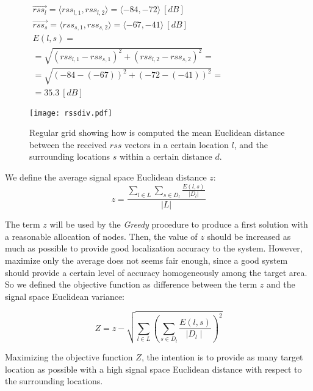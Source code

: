 \begin{figure}
\centering
\begin{minipage}{0.63\textwidth}

$
\begin{gathered}
\vec{rss_l} = \langle rss_{l,1}, rss_{l,2} \rangle = \langle-84, -72\rangle ~ [dB] \\
\vec{rss_s} = \langle rss_{s,1}, rss_{s,2} \rangle = \langle-67, -41\rangle ~ [dB] \\[5pt]
E(l,s) = \\ = \sqrt{(rss_{l,1} - rss_{s,1})^2 + (rss_{l,2} - rss_{s,2})^2} = \\
= \sqrt{(-84-(-67))^2 + (-72-(-41))^2} = \\ = 35.3 ~ [dB]
\end{gathered}
$

\end{minipage}%
\begin{minipage}{0.37\textwidth}
\centering\texttt{[image: rssdiv.pdf]}
\end{minipage}
\caption{Regular grid showing how is computed the mean Euclidean distance between the received $rss$ vectors in a certain location \(l\), and the surrounding locations $s$ within a certain distance \(d\).}
\label{fig:rssdiv}
\end{figure}

We define the average signal space Euclidean distance $z$:
\begin{equation}\label{eq:z1}
z = \frac{ \sum\limits_{l \in L} \sum\limits_{s \in D_l}\frac{E(l,s)}{|D_l|}}{|L|}
\end{equation}

The term $z$ will be used by the \emph{Greedy} procedure to produce a first solution with a reasonable allocation of nodes. Then, the value of $z$ should be increased as much as possible to provide good localization accuracy to the system. However, maximize only the average does not seems fair enough, since a good system should provide a certain level of accuracy homogeneously among the target area. So we defined the objective function as difference between the term $z$ and the signal space Euclidean variance:

\begin{equation}\label{eq:Z1}
Z = z - \sqrt{\sum\limits_{l\in L}\left(\sum\limits_{s\in D_l}\frac{E(l,s)}{\mid D_l \mid}\right)^2}
\end{equation}

Maximizing the objective function $Z$, the intention is to provide as many target location as possible with a high signal space Euclidean distance with respect to the surrounding locations.


